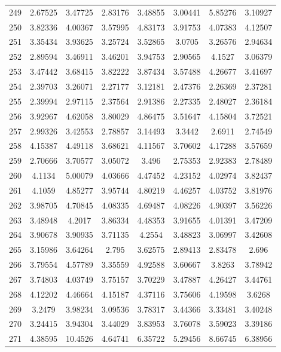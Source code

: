 \begin{center}
\begin{longtable}{cccccccc}
249 & 2.67525 & 3.47725 & 2.83176 & 3.48855 & 3.00441 & 5.85276 & 3.10927\\
250 & 3.82336 & 4.00367 & 3.57995 & 4.83173 & 3.91753 & 4.07383 & 4.12507\\
251 & 3.35434 & 3.93625 & 3.25724 & 3.52865 & 3.0705 & 3.26576 & 2.94634\\
252 & 2.89594 & 3.46911 & 3.46201 & 3.94753 & 2.90565 & 4.1527 & 3.06379\\
253 & 3.47442 & 3.68415 & 3.82222 & 3.87434 & 3.57488 & 4.26677 & 3.41697\\
254 & 2.39703 & 3.26071 & 2.27177 & 3.12181 & 2.47376 & 2.26369 & 2.37281\\
255 & 2.39994 & 2.97115 & 2.37564 & 2.91386 & 2.27335 & 2.48027 & 2.36184\\
256 & 3.92967 & 4.62058 & 3.80029 & 4.86475 & 3.51647 & 4.15804 & 3.72521\\
257 & 2.99326 & 3.42553 & 2.78857 & 3.14493 & 3.3442 & 2.6911 & 2.74549\\
258 & 4.15387 & 4.49118 & 3.68621 & 4.11567 & 3.70602 & 4.17288 & 3.57659\\
259 & 2.70666 & 3.70577 & 3.05072 & 3.496 & 2.75353 & 2.92383 & 2.78489\\
260 & 4.1134 & 5.00079 & 4.03666 & 4.47452 & 4.23152 & 4.02974 & 3.82437\\
261 & 4.1059 & 4.85277 & 3.95744 & 4.80219 & 4.46257 & 4.03752 & 3.81976\\
262 & 3.98705 & 4.70845 & 4.08335 & 4.69487 & 4.08226 & 4.90397 & 3.56226\\
263 & 3.48948 & 4.2017 & 3.86334 & 4.48353 & 3.91655 & 4.01391 & 3.47209\\
264 & 3.90678 & 3.90935 & 3.71135 & 4.2554 & 3.48823 & 3.06997 & 3.42608\\
265 & 3.15986 & 3.64264 & 2.795 & 3.62575 & 2.89413 & 2.83478 & 2.696\\
266 & 3.79554 & 4.57789 & 3.35559 & 4.92588 & 3.60667 & 3.8263 & 3.78942\\
267 & 3.74803 & 4.03749 & 3.75157 & 3.70229 & 3.47887 & 4.26427 & 3.44761\\
268 & 4.12202 & 4.46664 & 4.15187 & 4.37116 & 3.75606 & 4.19598 & 3.6268\\
269 & 3.2479 & 3.98234 & 3.09536 & 3.78317 & 3.44366 & 3.33481 & 3.40248\\
270 & 3.24415 & 3.94304 & 3.44029 & 3.83953 & 3.76078 & 3.59023 & 3.39186\\
271 & 4.38595 & 10.4526 & 4.64741 & 6.35722 & 5.29456 & 8.66745 & 6.38956\\

\end{longtable}
\end{center}
